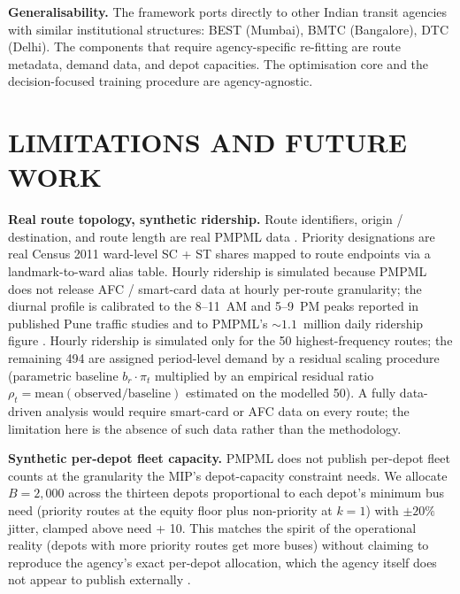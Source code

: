 \documentclass[a4paper,twoside]{article}
\begin{document}
\textbf{Generalisability.} The framework ports directly to other
Indian transit agencies with similar institutional structures:
BEST (Mumbai), BMTC (Bangalore), DTC (Delhi). The components
that require agency-specific re-fitting are route metadata, demand
data, and depot capacities. The optimisation core and the
decision-focused training procedure are agency-agnostic.

\section{\uppercase{Limitations and Future Work}}
\label{sec:limitations}

\textbf{Real route topology, synthetic ridership.} Route
identifiers, origin / destination, and route length are real
PMPML data \cite{opencity2024pmpml,datameetpune}. Priority
designations are real Census 2011 ward-level SC + ST shares
\cite{opencity2024census,census2011india} mapped to route
endpoints via a landmark-to-ward alias table. Hourly ridership
is simulated because PMPML does not release AFC / smart-card
data at hourly per-route granularity; the diurnal profile is
calibrated to the 8--11~AM and 5--9~PM peaks reported in
published Pune traffic studies and to PMPML's $\sim 1.1$~million
daily ridership figure \cite{itdp2024pmpml}. Hourly ridership is
simulated only for the 50 highest-frequency routes; the
remaining 494 are assigned period-level demand by a residual
scaling procedure (parametric baseline $b_r \cdot \pi_t$
multiplied by an empirical residual ratio
$\rho_t = \mathrm{mean}(\mathrm{observed} /
\mathrm{baseline})$ estimated on the modelled 50). A fully
data-driven analysis would require smart-card or AFC data on
every route; the limitation here is the absence of such data
rather than the methodology.

\textbf{Synthetic per-depot fleet capacity.} PMPML does not
publish per-depot fleet counts at the granularity the MIP's
depot-capacity constraint needs. We allocate $B = 2{,}000$ across
the thirteen depots proportional to each depot's minimum bus
need (priority routes at the equity floor plus non-priority at
$k = 1$) with $\pm 20\%$ jitter, clamped above need + 10. This
matches the spirit of the operational reality (depots with more
priority routes get more buses) without claiming to reproduce the
agency's exact per-depot allocation, which the agency itself does
not appear to publish externally \cite{ramaswamy2018pmpml}.
\end{document}
